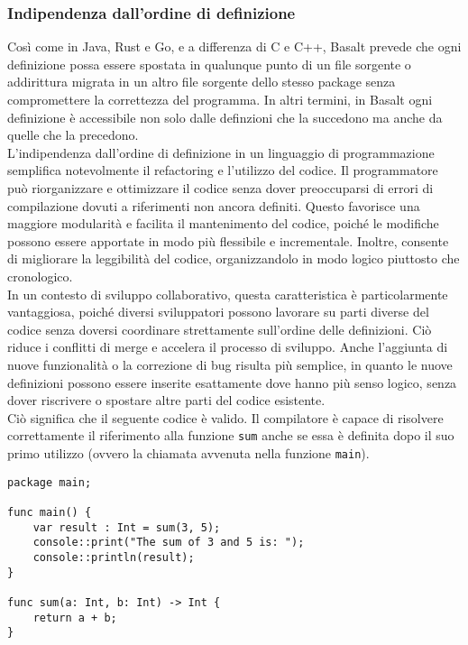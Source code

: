 \subsubsection{Indipendenza dall’ordine di definizione}
Così come in Java, Rust e Go, e a differenza di C e C++, Basalt prevede che ogni definizione possa essere spostata in qualunque punto di un file sorgente o addirittura migrata in 
un altro file sorgente dello stesso package senza compromettere la correttezza del programma. In altri termini, in Basalt ogni definizione è accessibile non solo dalle definzioni che 
la succedono ma anche da quelle che la precedono. \\

L'indipendenza dall'ordine di definizione in un linguaggio di programmazione semplifica notevolmente il refactoring e l'utilizzo del codice. Il programmatore può riorganizzare e ottimizzare 
il codice senza dover preoccuparsi di errori di compilazione dovuti a riferimenti non ancora definiti. Questo favorisce una maggiore modularità e facilita il mantenimento del codice, poiché 
le modifiche possono essere apportate in modo più flessibile e incrementale. Inoltre, consente di migliorare la leggibilità del codice, organizzandolo in modo logico piuttosto che cronologico. \\

In un contesto di sviluppo collaborativo, questa caratteristica è particolarmente vantaggiosa, poiché diversi sviluppatori possono lavorare su parti diverse del codice senza doversi coordinare 
strettamente sull'ordine delle definizioni. Ciò riduce i conflitti di merge e accelera il processo di sviluppo. Anche l'aggiunta di nuove funzionalità o la correzione di bug risulta più semplice, 
in quanto le nuove definizioni possono essere inserite esattamente dove hanno più senso logico, senza dover riscrivere o spostare altre parti del codice esistente. \\

Ciò significa che il seguente codice è valido. Il compilatore è capace di risolvere correttamente il riferimento alla 
funzione \texttt{sum} anche se essa è definita dopo il suo primo utilizzo (ovvero la chiamata avvenuta nella funzione \texttt{main}). \\

\begin{lstlisting}[frame=single]
package main;

func main() {
    var result : Int = sum(3, 5);
    console::print("The sum of 3 and 5 is: ");
    console::println(result);
}

func sum(a: Int, b: Int) -> Int {
    return a + b;
}
\end{lstlisting}